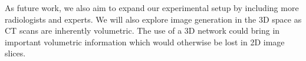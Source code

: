 \documentclass{article}
\begin{document}
As future work, we also aim to expand our experimental setup by including more radiologists and experts. We will also explore image generation in the 3D space as CT scans are inherently volumetric. The use of a 3D network could bring in important volumetric information which would otherwise be lost in 2D image slices.




\end{document}
